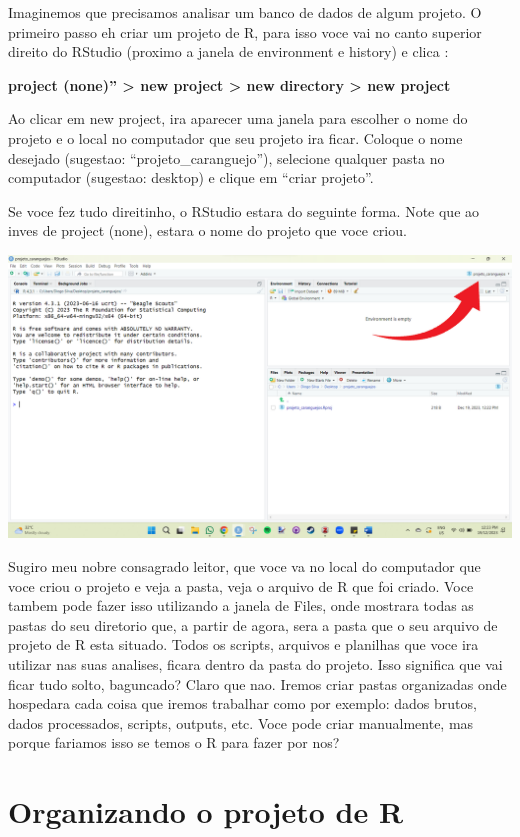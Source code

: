 \documentclass[
]{book}
\begin{document}
Imaginemos que precisamos analisar um banco de dados de algum projeto. O primeiro passo eh criar um projeto de R, para isso voce vai no canto superior direito do RStudio (proximo a janela de environment e history) e clica :

\textbf{project (none)'' \textgreater{} new project \textgreater{} new directory \textgreater{} new project}

Ao clicar em new project, ira aparecer uma janela para escolher o nome do projeto e o local no computador que seu projeto ira ficar. Coloque o nome desejado (sugestao: ``projeto\_caranguejo''), selecione qualquer pasta no computador (sugestao: desktop) e clique em ``criar projeto''.

Se voce fez tudo direitinho, o RStudio estara do seguinte forma. Note que ao inves de project (none), estara o nome do projeto que voce criou.

\includegraphics{img/tela_do_projeto.png}

Sugiro meu nobre consagrado leitor, que voce va no local do computador que voce criou o projeto e veja a pasta, veja o arquivo de R que foi criado. Voce tambem pode fazer isso utilizando a janela de Files, onde mostrara todas as pastas do seu diretorio que, a partir de agora, sera a pasta que o seu arquivo de projeto de R esta situado. Todos os scripts, arquivos e planilhas que voce ira utilizar nas suas analises, ficara dentro da pasta do projeto. Isso significa que vai ficar tudo solto, baguncado? Claro que nao. Iremos criar pastas organizadas onde hospedara cada coisa que iremos trabalhar como por exemplo: dados brutos, dados processados, scripts, outputs, etc. Voce pode criar manualmente, mas porque fariamos isso se temos o R para fazer por nos?

\hypertarget{organizando-o-projeto-de-r}{%
\section{Organizando o projeto de R}\label{organizando-o-projeto-de-r}}
\end{document}
